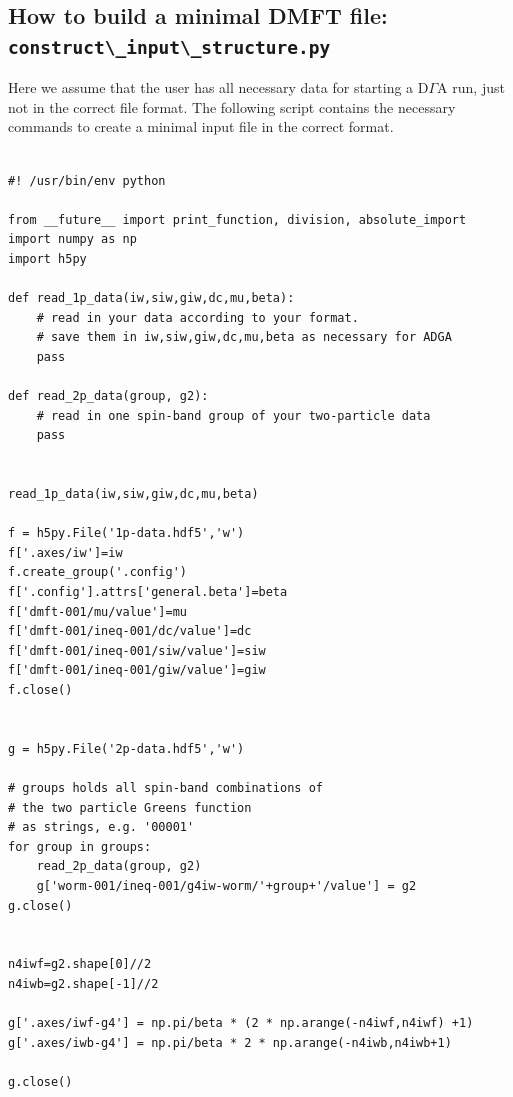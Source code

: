 \documentclass[a4paper,11pt]{article}
\numberwithin{equation}{section} %
\begin{document}
\newpage
\subsection*{How to build a minimal DMFT file: \protect\Verb=construct\_input\_structure.py=}
Here we assume that the user has all necessary data for starting a D$\Gamma$A run,
just not in the correct file format. The following script contains the necessary 
commands to create a minimal input file in the correct format.

\begin{verbatim}

#! /usr/bin/env python

from __future__ import print_function, division, absolute_import
import numpy as np
import h5py

def read_1p_data(iw,siw,giw,dc,mu,beta):
    # read in your data according to your format.
    # save them in iw,siw,giw,dc,mu,beta as necessary for ADGA
    pass

def read_2p_data(group, g2):
    # read in one spin-band group of your two-particle data
    pass


read_1p_data(iw,siw,giw,dc,mu,beta)

f = h5py.File('1p-data.hdf5','w')
f['.axes/iw']=iw
f.create_group('.config')
f['.config'].attrs['general.beta']=beta
f['dmft-001/mu/value']=mu
f['dmft-001/ineq-001/dc/value']=dc
f['dmft-001/ineq-001/siw/value']=siw
f['dmft-001/ineq-001/giw/value']=giw
f.close()


g = h5py.File('2p-data.hdf5','w')

# groups holds all spin-band combinations of
# the two particle Greens function
# as strings, e.g. '00001'
for group in groups: 
    read_2p_data(group, g2)
    g['worm-001/ineq-001/g4iw-worm/'+group+'/value'] = g2
g.close()


n4iwf=g2.shape[0]//2
n4iwb=g2.shape[-1]//2

g['.axes/iwf-g4'] = np.pi/beta * (2 * np.arange(-n4iwf,n4iwf) +1)
g['.axes/iwb-g4'] = np.pi/beta * 2 * np.arange(-n4iwb,n4iwb+1)

g.close()

\end{verbatim}
\end{document}
